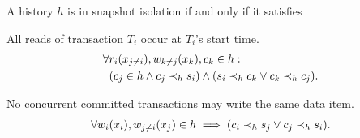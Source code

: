 \begin{frame}{}
  A history $h$ is in snapshot isolation if and only if it satisfies  \\[0.20cm]
  \begin{description}
    \item[Snapshot Read:] All reads of transaction $T_i$ occur at $T_i$'s start time.
      \begin{align*}
	\forall &r_i(x_{j \neq i}), w_{k \neq j}(x_k), c_k \in h: \\
	& (c_j \in h \land c_j \prec_{h} s_i)
	 \land (s_i \prec_{h} c_k \lor c_k \prec_{h} c_j).
      \end{align*}
    \item[Snapshot Write:] No concurrent committed transactions may write the same data item.
      \begin{align*}
	\forall w_i(x_i), w_{j \neq i}(x_j) \in h \implies (c_i \prec_{h} s_j \lor c_j \prec_{h} s_i).
      \end{align*}
  \end{description}
\end{frame}
